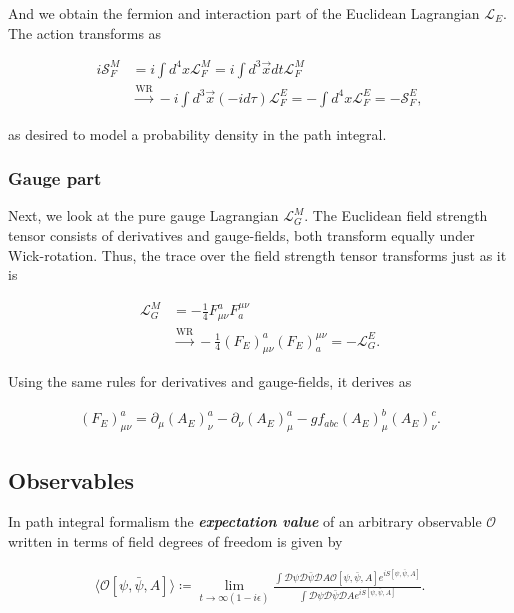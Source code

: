 \documentclass{article}
\theoremstyle{plain} %
\theoremstyle{convention} %
\theoremstyle{remark} %
\def\df#1{\textbf{\textit{#1}}}
\numberwithin{equation}{section}
\begin{document}
And we obtain the fermion and interaction part of the Euclidean Lagrangian $\mathcal{L}_E$. The action transforms as

\begin{align*}
    i \mathcal{S}_{F}^M &= i \int d^4x \mathcal{L}_{F}^M = i \int d^3\vec{x} dt \mathcal{L}_{F}^M \\
    &\stackrel{\text{WR}}{\longrightarrow} - i \int d^3\vec{x} (-i d\tau) \mathcal{L}_{F}^E = - \int d^4x \mathcal{L}_{F}^E = - \mathcal{S}_{F}^E,
\end{align*}

as desired to model a probability density in the path integral.

\subsubsection{Gauge part}

Next, we look at the pure gauge Lagrangian $\mathcal{L}_{G}^M$. The Euclidean field strength tensor consists of derivatives and gauge-fields, both transform equally under Wick-rotation. Thus, the trace over the field strength tensor transforms just as it is

\begin{align*}
    \mathcal{L}_G^M &= - \frac{1}{4} F_{\mu \nu}^a F_a^{\mu \nu} \\
    &\stackrel{\text{WR}}{\longrightarrow} - \frac{1}{4} (F_E)_{\mu \nu}^a (F_E)_a^{\mu \nu} = - \mathcal{L}_G^E.
\end{align*}

Using the same rules for derivatives and gauge-fields, it derives as

\begin{align*}
    (F_E)_{\mu \nu}^a = \partial_{\mu} (A_E)_{\nu}^a - \partial_{\nu} (A_E)_{\mu}^a - g f_{abc} (A_E)_{\mu}^b (A_E)_{\nu}^c.
\end{align*}

\subsection{Observables}

In path integral formalism the \df{expectation value} of an arbitrary observable $\mathcal{O}$ written in terms of field degrees of freedom is given by

\begin{align}
    \langle \mathcal{O}[\psi, \bar{\psi}, A] \rangle \coloneqq \lim_{t \to \infty(1-i \epsilon)} \frac{ \int \mathcal{D}\psi \mathcal{D} \bar{\psi} \mathcal{D} A \mathcal{O}[\psi, \bar{\psi}, A] e^{iS[\psi, \bar{\psi}, A]} }{ \int \mathcal{D}\psi \mathcal{D} \bar{\psi} \mathcal{D} A e^{iS[\psi, \bar{\psi}, A]} }. \label{eq:expectation_value}
\end{align}
\end{document}
